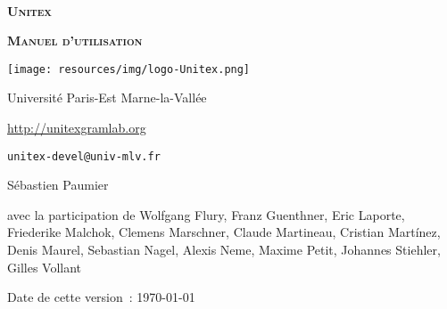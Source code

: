 
\begin{titlepage}
\begin{center}

~

\vspace{3cm}
\Huge
\textsc{\textbf{Unitex \UnitexVersion{}}}

\vspace{1cm}

\huge
\textsc{\textbf{Manuel d'utilisation}}

\vspace{2cm}

  \begin{center}
    \texttt{[image: resources/img/logo-Unitex.png]}
  \end{center}
\normalsize

\vspace{2cm}

\LARGE

Université Paris-Est Marne-la-Vallée
\bigskip
\normalsize

\url{http://unitexgramlab.org}

\verb$unitex-devel@univ-mlv.fr$

\vspace{1cm}

Sébastien Paumier
\bigskip

avec la participation de Wolfgang Flury, Franz Guenthner, Eric Laporte,\\
Friederike Malchok, Clemens Marschner, Claude Martineau, Cristian Martínez,\\
Denis Maurel, Sebastian Nagel, Alexis Neme, Maxime Petit, Johannes Stiehler,\\
Gilles Vollant
\bigskip

\mydate
Date de cette version~: \today
\end{center}

\end{titlepage}
